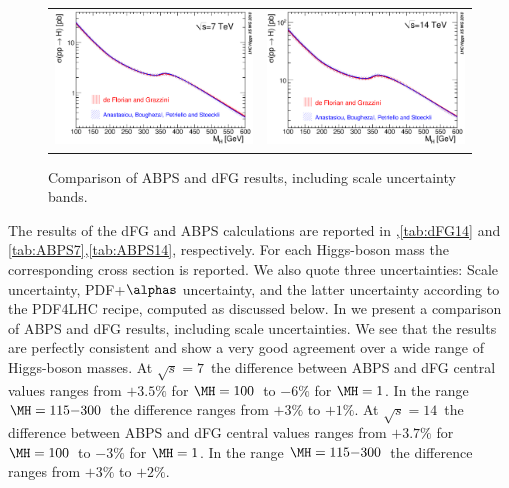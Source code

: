 \begin{figure}[htb]
\vspace{5pt}
\begin{center}
\begin{tabular}{cc}
\includegraphics[width=.46\linewidth]{YRHXS_ggF/YRHXS_ggF_fig1} &
\includegraphics[width=.46\linewidth]{YRHXS_ggF/YRHXS_ggF_fig2}\\
\end{tabular}
\end{center}
\caption{Comparison of ABPS \cite{Anastasiou:2008tj} and dFG \cite{deFlorian:2009hc} results, including scale uncertainty bands.}
\label{fig:comp}
\end{figure}

The results of the dFG and ABPS calculations are reported in ,\ref{tab:dFG14} and \ref{tab:ABPS7},\ref{tab:ABPS14}, respectively.
For each Higgs-boson mass the corresponding cross section is reported.
We also quote three uncertainties: Scale uncertainty, PDF+$\alphas$ uncertainty,
and the latter uncertainty according to the PDF4LHC recipe, computed as discussed below.
In  we present a comparison of ABPS and dFG results, including scale uncertainties. We see that the results are perfectly 
consistent and show a very good agreement over a wide range of Higgs-boson masses.
At $\sqrt{s}=7$\UTeV\ the difference between ABPS and dFG central values ranges from $+3.5\%$ for $\MH=100$\UGeV\
to $-6\%$ for $\MH=1$\UTeV. In the range $\MH=115{-}300$\UGeV\ the difference ranges from $+3\%$ to $+1\%$.
At $\sqrt{s}=14$\UTeV\ the difference between ABPS and dFG central values ranges from $+3.7\%$ for $\MH=100$\UGeV\
to $-3\%$ for $\MH=1$\UTeV. In the range $\MH=115{-}300$\UGeV\ the difference ranges from $+3\%$ to $+2\%$.

